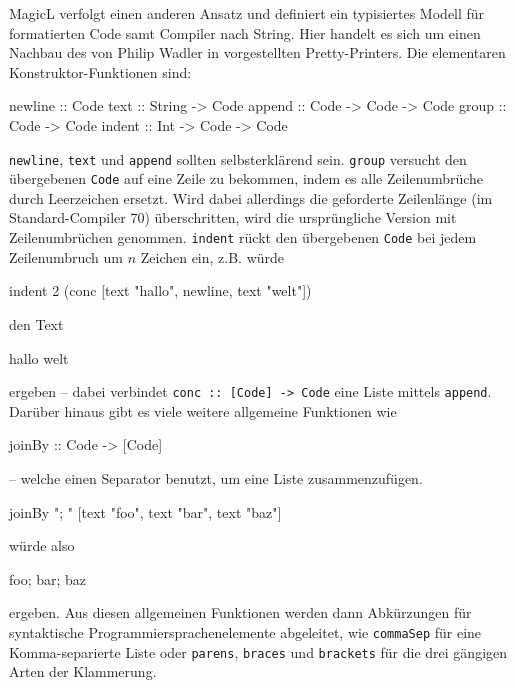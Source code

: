 \documentclass[12pt, a4paper, bibgerm]{scrbook}
\newenvironment{DIFnomarkup}{}{}
\newcommand\icode[1]{\lstinline?#1?}
\begin{document}
MagicL verfolgt einen anderen Ansatz und definiert ein typisiertes
Modell für formatierten Code samt Compiler nach String. Hier handelt es
sich um einen Nachbau des von Philip Wadler in
\cite[S.223ff]{FunOfProgramming} vorgestellten Pretty-Printers. Die
elementaren Konstruktor-Funktionen sind:
\begin{DIFnomarkup}\begin{code}
newline :: Code
text    :: String -> Code
append  :: Code   -> Code -> Code
group   :: Code   -> Code
indent  :: Int    -> Code -> Code
\end{code}\end{DIFnomarkup}

\icode{newline}, \icode{text} und \icode{append} sollten selbsterklärend
sein. \icode{group} versucht den übergebenen \icode{Code} auf eine Zeile
zu bekommen, indem es alle Zeilenumbrüche durch Leerzeichen
ersetzt. Wird dabei allerdings die geforderte Zeilenlänge (im
Standard-Compiler 70) überschritten, wird die ursprüngliche Version mit
Zeilenumbrüchen genommen. \icode{indent} rückt den übergebenen
\icode{Code} bei jedem Zeilenumbruch um $n$ Zeichen ein, z.B. würde
\begin{DIFnomarkup}\begin{code}
indent 2 (conc [text "hallo", newline, text "welt"])
\end{code}\end{DIFnomarkup}
den Text
\begin{DIFnomarkup}\begin{code}
hallo
  welt
\end{code}\end{DIFnomarkup}
ergeben -- dabei verbindet \icode{conc :: [Code] -> Code} eine Liste
mittels \icode{append}. Darüber hinaus gibt es viele weitere allgemeine
Funktionen wie
\begin{DIFnomarkup}\begin{code}
  joinBy :: Code -> [Code]
\end{code}\end{DIFnomarkup}
-- welche einen Separator benutzt, um eine Liste zusammenzufügen.
\begin{DIFnomarkup}\begin{code}
joinBy "; " [text "foo", text "bar", text "baz"]
\end{code}\end{DIFnomarkup}
würde also
\begin{DIFnomarkup}\begin{code}
foo; bar; baz
\end{code}\end{DIFnomarkup}
ergeben. Aus diesen allgemeinen Funktionen werden dann Abkürzungen für
syntaktische Programmiersprachenelemente abgeleitet, wie
\icode{commaSep} für eine Komma-separierte Liste oder \icode{parens},
\icode{braces} und \icode{brackets} für die drei gängigen Arten der
Klammerung.
\end{document}
